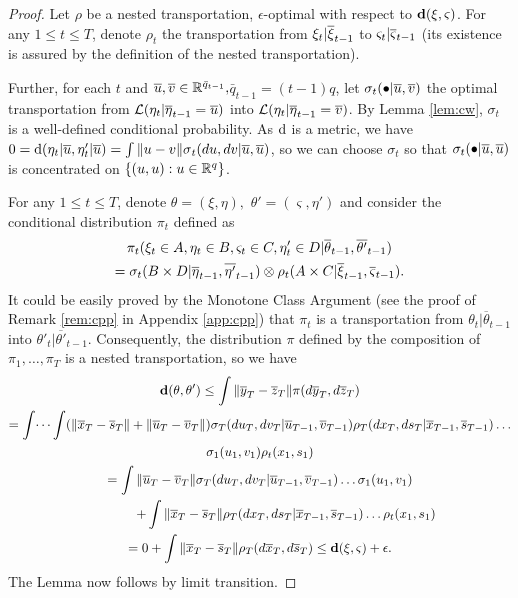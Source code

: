 \documentclass{article}              %
\begin{document}
\begin{proof}
Let $\rho$ be a nested transportation, $\epsilon$-optimal with respect
to $\mathbf{d}(\xi,\varsigma)$. For any $1\leq t\leq T$, denote $\rho_t$ the transportation from $\xi_t|\overline{\xi}_{t-1}$ to 
$\varsigma_t|\overline{\varsigma}_{t-1}$ (its existence is assured by the definition of the nested transportation).

Further, for each $t$ and $\overline{u},\overline{v}\in\mathbb{R}^{\bar{q}_{t-1}},$$\bar{q}_{t-1}=(t-1)q$,
let $\sigma_{t}(\bullet|\overline{u},\overline{v})$ the optimal transportation
from $\mathcal{L}(\eta_{t}|\overline{\eta}_{t-1}=\overline{u})$ into $\mathcal{L}(\eta_{t}|\overline{\eta}_{t-1}=\overline{v})$.
By Lemma \ref{lem:cw}, $\sigma_{t}$ is a well-defined conditional probability. As $\mathrm{d}$ is a metric, we have $0=\mathrm{d}(\eta_{t}|\overline{u},\eta'_{t}|\overline{u})=\int\|u-v\|\sigma{}_{t}(du,dv|\overline{u},\overline{u})$, so we can choose $\sigma_{t}$ so that $\sigma_{t}(\bullet|\overline{u},\overline{u})$
is concentrated on $\{(u,u):u\in\mathbb{R}^{q}\}$.

For any $1\leq t\leq T$, denote $\theta=(\xi,\eta),$ $\theta'=(\varsigma,\eta')$
and consider the conditional distribution $\pi_t$ defined as
\begin{multline*}
\pi_{t}(\xi_{t}\in A,\eta_{t}\in B,\varsigma_{t}\in C,\eta'_{t}\in D|\overline{\theta}_{t-1},\overline{\theta'}_{t-1})
\\
=\sigma_{t}(B\times D|\overline{\eta}_{t-1},\overline{\eta'}_{t-1})\otimes\rho_{t}(A\times C|\overline{\xi}_{t-1},\overline{\varsigma}_{t-1}).
\end{multline*}
It could be easily proved by the Monotone Class Argument (see the
proof of Remark \ref{rem:cpp} in Appendix \ref{app:cpp}) that $\pi_{t}$ is a transportation
from $\theta_{t}|\overline{\theta}_{t-1}$ into $\theta'_{t}|\overline{\theta'}_{t-1}$.
Consequently, the distribution $\pi$ defined by the composition of
$\pi_{1},\dots,\pi_{T}$ is a nested transportation, so we have
\begin{multline*}
\mathbf{d}(\theta,\theta')\leq\int\|\overline{y}_{T}-\overline{z}_{T}\|\pi(d\overline{y}_{T},d\overline{z}_{T})\\
=\int\dots\int(\|\overline{x}_{T}-\overline{s}_{T}\|+\|\overline{u}_{T}-\overline{v}_{T}\|)\sigma_{T}(du_{T},dv_{T}|\overline{u}_{T-1},\overline{v}_{T-1})\rho_{T}(dx_{T},ds_{T}|\overline{x}_{T-1},\overline{s}_{T-1})\dots\\
\sigma_{1}(u_{1},v_{1})\rho_{t}(x_{1},s_{1})\\
=\int\|\overline{u}_{T}-\overline{v}_{T}\|\sigma_{T}(du_{T},dv_{T}|\overline{u}_{T-1},\overline{v}_{T-1})\dots\sigma_{1}(u_{1},v_{1})
\\
\qquad\qquad +\int\|\overline{x}_{T}-\overline{s}_{T}\|\rho_{T}(dx_{T},ds_{T}|\overline{x}_{T-1},\overline{s}_{T-1})\dots\rho_{t}(x_{1},s_{1})\\
=0+\int\|\overline{x}_{T}-\overline{s}_{T}\|\rho_{T}(d\overline{x}_{T},d\overline{s}_{T})\leq\mathbf{d}(\xi,\varsigma)+\epsilon.
\end{multline*}
The Lemma now follows by limit transition.
\end{proof}
 
\end{document}
